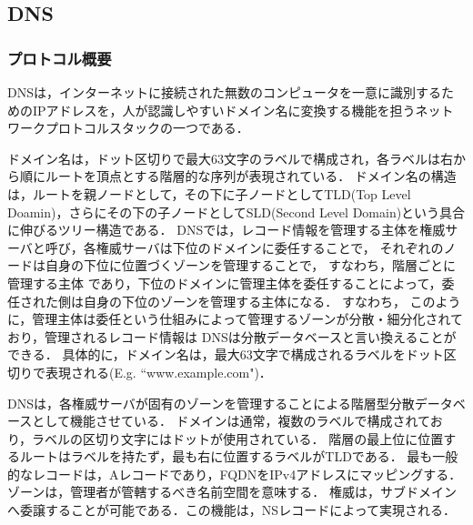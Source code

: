 \documentclass[12pt]{jarticle} %
\begin{document}
\subsection{DNS}
\subsubsection{プロトコル概要}
DNSは，インターネットに接続された無数のコンピュータを一意に識別するためのIPアドレスを，人が認識しやすいドメイン名に変換する機能を担うネットワークプロトコルスタックの一つである．

ドメイン名は，ドット区切りで最大63文字のラベルで構成され，各ラベルは右から順にルートを頂点とする階層的な序列が表現されている．
ドメイン名の構造は，ルートを親ノードとして，その下に子ノードとしてTLD(Top Level Doamin)，さらにその下の子ノードとしてSLD(Second Level Domain)という具合に伸びるツリー構造である．
DNSでは，レコード情報を管理する主体を権威サーバと呼び，各権威サーバは下位のドメインに委任することで，
それぞれのノードは自身の下位に位置づくゾーンを管理することで，
すなわち，階層ごとに管理する主体
であり，下位のドメインに管理主体を委任することによって，委任された側は自身の下位のゾーンを管理する主体になる．
すなわち，
このように，管理主体は委任という仕組みによって管理するゾーンが分散・細分化されており，管理されるレコード情報は
DNSは分散データベースと言い換えることができる．
具体的に，ドメイン名は，最大63文字で構成されるラベルをドット区切りで表現される(E.g. ``www.example.com")．



DNSは，各権威サーバが固有のゾーンを管理することによる階層型分散データベースとして機能させている．
ドメインは通常，複数のラベルで構成されており，ラベルの区切り文字にはドットが使用されている．
階層の最上位に位置するルートはラベルを持たず，最も右に位置するラベルがTLDである．
最も一般的なレコードは，Aレコードであり，FQDNをIPv4アドレスにマッピングする．
ゾーンは，管理者が管轄するべき名前空間を意味する．
権威は，サブドメインへ委譲することが可能である．この機能は，NSレコードによって実現される．
\end{document}
